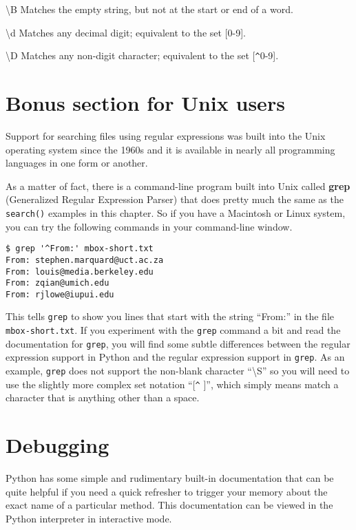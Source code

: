 {\textbackslash}B \newline
Matches the empty string, but not at the start or end of a word.

{\textbackslash}d \newline
Matches any decimal digit; equivalent to the set [0-9].

{\textbackslash}D \newline
Matches any non-digit character; equivalent to the set [\verb"^"0-9].

\section{Bonus section for Unix users}

Support for searching files using regular expressions was built into the Unix operating system 
since the 1960s and it is available in nearly all programming languages in one form or another.

As a matter of fact, there is a command-line program built into Unix 
called {\bf grep} (Generalized Regular Expression Parser) that does pretty much 
the same as the {\tt search()} examples in this chapter.  So if you have a 
Macintosh or Linux system, you can try the following commands in your command-line window.

\beforeverb
\begin{verbatim}
$ grep '^From:' mbox-short.txt
From: stephen.marquard@uct.ac.za
From: louis@media.berkeley.edu
From: zqian@umich.edu
From: rjlowe@iupui.edu
\end{verbatim}
\afterverb
%
This tells {\tt grep} to show you lines that start with the string ``From:'' in the file
{\tt mbox-short.txt}.   If you experiment with the {\tt grep} command a bit and read the
documentation for {\tt grep}, you will find some subtle differences between the regular
expression support in Python and the regular expression support in {\tt grep}.  As an example,
{\tt grep} does not support the non-blank character ``{\textbackslash}S'' so you will need to
use the slightly more complex set notation ``[\verb"^" ]'', which simply means match a 
character that is anything other than a space.

\section{Debugging}

Python has some simple and rudimentary built-in documentation that can be quite helpful if
you need a quick refresher to trigger your memory about the exact name of a particular method.
This documentation can be viewed in the Python interpreter in interactive mode.

